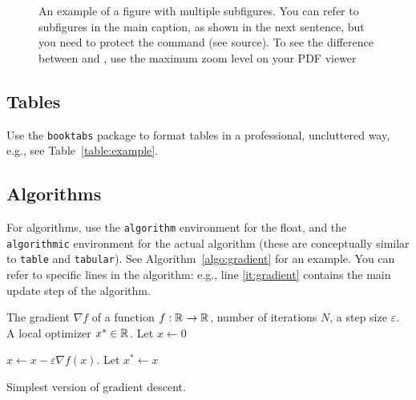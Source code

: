 \documentclass[letterpaper, 10 pt, conference]{ieeeconf}
\begin{document}
\begin{figure}[t]
  \caption{An example of a figure with multiple subfigures. You can refer to subfigures in the main caption, as shown in the next sentence, but you need to protect the command (see source). To see the difference between \protect{} and \protect{}, use the maximum zoom level on your PDF viewer}
  \label{fig:trajectories}
\end{figure}

\subsection{Tables}
 Use the \texttt{booktabs} package to format tables in a professional, uncluttered way, e.g., see Table~\ref{table:example}.

\subsection{Algorithms}
For algorithms, use the \verb|algorithm| environment for the float, and the \verb|algorithmic| environment for the actual algorithm (these are conceptually similar to \verb|table| and \verb|tabular|). See Algorithm~\ref{algo:gradient} for an example. You can refer to specific lines in the algorithm: e.g., line \ref{it:gradient} contains the main update step of the algorithm.

\begin{algorithm}
  \begin{algorithmic}[1]
    \Require The gradient $\nabla f$ of a function $f:\mathbb{R}^{}{}\to\mathbb{R}^{}{}$, number of iterations $N$, a step size $\varepsilon$.
    \Ensure A local optimizer $x^\ast\in\mathbb{R}^{}{}$.
    \State Let $x\gets 0$ 

    \State $x\gets x-\varepsilon\nabla f(x)$. \label{it:gradient} 
    \EndFor
    \State Let $x^\ast\gets x$
    \label{it:endwhile}
  \end{algorithmic}
  \caption{Simplest version of gradient descent.}
  \label{algo:gradient}
\end{algorithm}
\end{document}

